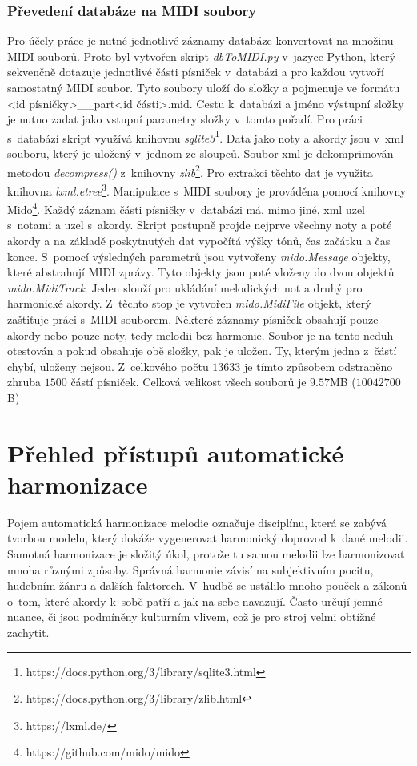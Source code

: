 \subsection{Převedení databáze na MIDI soubory}
Pro účely práce je nutné jednotlivé záznamy databáze
konvertovat na množinu MIDI souborů.
Proto byl vytvořen skript \emph{dbToMIDI.py} v~jazyce Python,
který sekvenčně dotazuje jednotlivé části písniček v~databázi
a pro každou vytvoří samostatný MIDI soubor.
Tyto soubory uloží do složky 
a pojmenuje ve formátu {<id písničky>\_\_part<id části>.mid}.
Cestu k~databázi a jméno výstupní složky 
je nutno zadat jako vstupní parametry složky v~tomto pořadí.
Pro práci s~databází skript využívá knihovnu \emph{sqlite3}\footnote{https://docs.python.org/3/library/sqlite3.html}.
Data jako noty a akordy jsou v~xml souboru, 
který je uložený v~jednom ze sloupců.
Soubor xml je dekomprimován metodou \emph{decompress()} z~knihovny 
\emph{zlib}\footnote{https://docs.python.org/3/library/zlib.html},
Pro extrakci těchto dat je využita knihovna \emph{lxml.etree}\footnote{https://lxml.de/}.
Manipulace s~MIDI soubory je prováděna pomocí knihovny Mido\footnote{https://github.com/mido/mido}.
Každý záznam části písničky v~databázi má, mimo jiné, 
xml uzel s~notami a uzel s~akordy.
Skript postupně projde nejprve všechny noty a poté akordy
a na základě poskytnutých dat vypočítá výšky tónů, čas začátku a čas konce.
S~pomocí výsledných parametrů jsou vytvořeny \emph{mido.Message} objekty,
které abstrahují MIDI zprávy.
Tyto objekty jsou poté vloženy do dvou objektů \emph{mido.MidiTrack}.
Jeden slouží pro ukládání melodických not a druhý pro harmonické akordy.
Z~těchto stop je vytvořen \emph{mido.MidiFile} objekt, který zaštiťuje práci s~MIDI souborem.
Některé záznamy písniček obsahují pouze akordy nebo pouze noty, tedy melodii bez harmonie.
Soubor je na tento neduh otestován a pokud obsahuje obě složky, pak je uložen.
Ty, kterým jedna z~částí chybí, uloženy nejsou.
Z~celkového počtu $13 633$ je tímto způsobem odstraněno zhruba $1500$ částí písniček.
Celková velikost všech souborů je $9.57$MB ($10 042 700$B)

\chapter{Přehled přístupů automatické harmonizace}
\label{prehledPristupus}
Pojem automatická harmonizace melodie označuje disciplínu, která se zabývá tvorbou modelu, 
který dokáže vygenerovat harmonický doprovod k~dané melodii.
Samotná harmonizace je složitý úkol, 
protože tu samou melodii lze harmonizovat mnoha různými způsoby.
Správná harmonie závisí na subjektivním pocitu, hudebním žánru a dalších faktorech.
V~hudbě se ustálilo mnoho pouček a zákonů o~tom, které akordy k~sobě patří
a jak na sebe navazují.
Často určují jemné nuance, či jsou podmíněny kulturním vlivem, 
což je pro stroj velmi obtížné zachytit.
\cite{YinCheng_comparativeStudy}
\par

